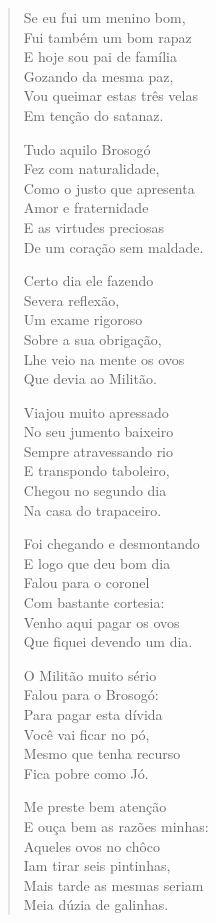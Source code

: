 \begin{verse}
Se eu fui um menino bom,\\
Fui também um bom rapaz\\
E hoje sou pai de família\\
Gozando da mesma paz,\\
Vou queimar estas três velas\\
Em tenção do satanaz.

Tudo aquilo Brosogó\\
Fez com naturalidade,\\
Como o justo que apresenta\\
Amor e fraternidade\\
E as virtudes preciosas\\
De um coração sem maldade.

Certo dia ele fazendo\\
Severa reflexão,\\
Um exame rigoroso\\
Sobre a sua obrigação,\\
Lhe veio na mente os ovos\\
Que devia ao Militão.

Viajou muito apressado\\
No seu jumento baixeiro\\
Sempre atravessando rio\\
E transpondo taboleiro,\\
Chegou no segundo dia\\
Na casa do trapaceiro.

Foi chegando e desmontando\\
E logo que deu bom dia\\
Falou para o coronel\\
Com bastante cortesia:\\
Venho aqui pagar os ovos\\
Que fiquei devendo um dia.

O Militão muito sério\\
Falou para o Brosogó:\\
Para pagar esta dívida\\
Você vai ficar no pó,\\
Mesmo que tenha recurso\\
Fica pobre como Jó.

Me preste bem atenção\\
E ouça bem as razões minhas:\\
Aqueles ovos no chôco\\
Iam tirar seis pintinhas,\\
Mais tarde as mesmas seriam\\
Meia dúzia de galinhas.


\end{verse}
